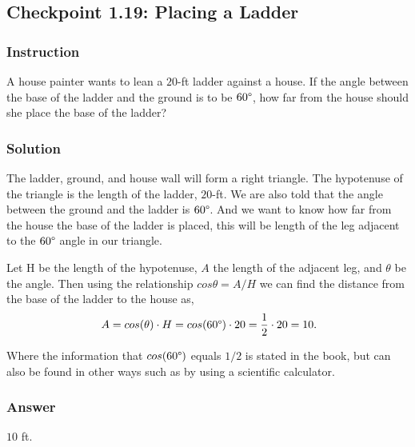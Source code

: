 \subsection*{Checkpoint 1.19: Placing a Ladder}

\subsubsection*{Instruction}

A house painter wants to lean a $20$-ft ladder against a house. If the angle between the base of the ladder and the ground is to be $ 60 \degree $, how far from the house should she place the base of the ladder?

\subsubsection*{Solution}

The ladder, ground, and house wall will form a right triangle. The hypotenuse of the triangle is the length of the ladder, $20$-ft. We are also told that the angle between the ground and the ladder is $ 60 \degree $. And we want to know how far from the house the base of the ladder is placed, this will be length of the leg adjacent to the $ 60 \degree $ angle in our triangle.

Let H be the length of the hypotenuse, $A$ the length of the adjacent leg, and $ \theta $ be the angle. Then using the relationship $ cos \theta = A/H $ we can find the distance from the base of the ladder to the house as,
\[ \phantom{.} A = cos(\theta) \cdot H = cos(60 \degree ) \cdot 20 = \frac{1}{2} \cdot 20 = 10 \text{.} \]

Where the information that $cos(60 \degree)$ equals $ 1/2 $ is stated in the book, but can also be found in other ways such as by using a scientific calculator.

\subsubsection*{Answer}

$10$ ft.
